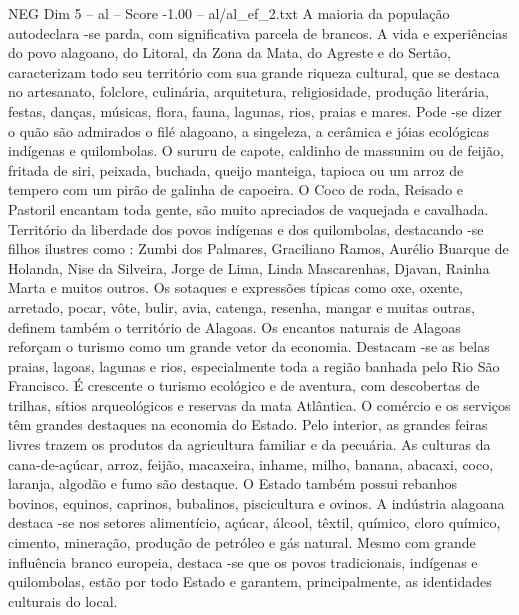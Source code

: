 \begin{textsample}{NEG Dim 5 – al – Score -1.00 – al/al\_ef\_2.txt}
A maioria da população autodeclara -se parda, com significativa parcela de brancos.
A vida e experiências do povo alagoano, do Litoral, da Zona da Mata, do Agreste e do Sertão, caracterizam todo seu território com sua grande riqueza cultural, que se destaca no artesanato, folclore, culinária, arquitetura, religiosidade, produção literária, festas, danças, músicas, flora, fauna, lagunas, rios, praias e mares.
Pode -se dizer o quão são admirados o filé alagoano, a singeleza, a cerâmica e jóias ecológicas indígenas e quilombolas.
O sururu de capote, caldinho de massunim ou de feijão, fritada de siri, peixada, buchada, queijo manteiga, tapioca ou um arroz de tempero com um pirão de galinha de capoeira.
O Coco de roda, Reisado e Pastoril encantam toda gente, são muito apreciados de vaquejada e cavalhada.
Território da liberdade dos povos indígenas e dos quilombolas, destacando -se filhos ilustres como : Zumbi dos Palmares, Graciliano Ramos, Aurélio Buarque de Holanda, Nise da Silveira, Jorge de Lima, Linda Mascarenhas, Djavan, Rainha Marta e muitos outros.
Os sotaques e expressões típicas como oxe, oxente, arretado, pocar, vôte, bulir, avia, catenga, resenha, mangar e muitas outras, definem também o território de Alagoas.
Os encantos naturais de Alagoas reforçam o turismo como um grande vetor da economia.
Destacam -se as belas praias, lagoas, lagunas e rios, especialmente toda a região banhada pelo Rio São Francisco.
É crescente o turismo ecológico e de aventura, com descobertas de trilhas, sítios arqueológicos e reservas da mata Atlântica.
O comércio e os serviços têm grandes destaques na economia do Estado.
Pelo interior, as grandes feiras livres trazem os produtos da agricultura familiar e da pecuária.
As culturas da cana-de-açúcar, arroz, feijão, macaxeira, inhame, milho, banana, abacaxi, coco, laranja, algodão e fumo são destaque.
O Estado também possui rebanhos bovinos, equinos, caprinos, bubalinos, piscicultura e ovinos.
A indústria alagoana destaca -se nos setores alimentício, açúcar, álcool, têxtil, químico, cloro químico, cimento, mineração, produção de petróleo e gás natural.
Mesmo com grande influência branco europeia, destaca -se que os povos tradicionais, indígenas e quilombolas, estão por todo Estado e garantem, principalmente, as identidades culturais do local.

\end{textsample}
